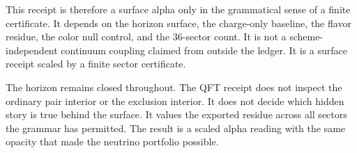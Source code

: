 This receipt is therefore a surface alpha only in the grammatical sense of a
finite certificate. It depends on the horizon surface, the charge-only
baseline, the flavor residue, the color null control, and the \(36\)-sector
count. It is not a scheme-independent continuum coupling claimed from
outside the ledger. It is a surface receipt scaled by a finite sector
certificate.

The horizon remains closed throughout. The QFT receipt does not inspect the
ordinary pair interior or the exclusion interior. It does not decide which
hidden story is true behind the surface. It values the exported residue
across all sectors the grammar has permitted. The result is a scaled alpha
reading with the same opacity that made the neutrino portfolio possible.
